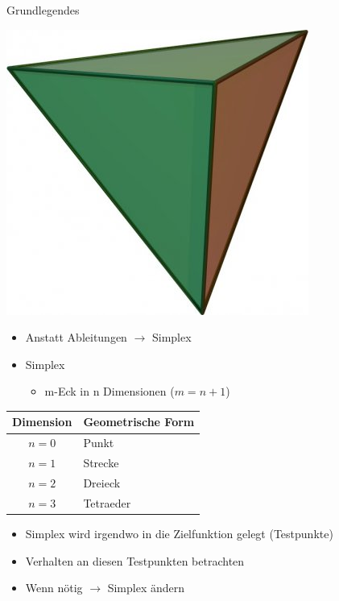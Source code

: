\documentclass[\outputformat]{beamer}
\begin{document}
\begin{frame}{Grundlegendes}
	\begin{minipage}[m]{4cm}
		\includegraphics[height=0.3\paperheight]{tetraeder.jpg}
	\end{minipage}
	\begin{minipage}[m]{7cm}
		\begin{itemize}
			\item Anstatt Ableitungen $\rightarrow$ Simplex
			\item Simplex
				\begin{itemize}
					\item m-Eck in n Dimensionen ($m=n+1$)\\
				\end{itemize}
		\end{itemize}
		\begin{tabular}{c|l}
		Dimension & Geometrische Form\\
		\hline
		$n=0$ & Punkt\\
		$n=1$ & Strecke\\
		$n=2$ & Dreieck\\
		$n=3$ & Tetraeder
		\end{tabular} 
		\begin{itemize}
			\pause\item Simplex wird irgendwo in die Zielfunktion gelegt (Testpunkte)
			\pause\item Verhalten an diesen Testpunkten betrachten
			\pause\item Wenn nötig $\rightarrow$ Simplex ändern
		\end{itemize}
	\end{minipage}
\end{frame}
\end{document}
